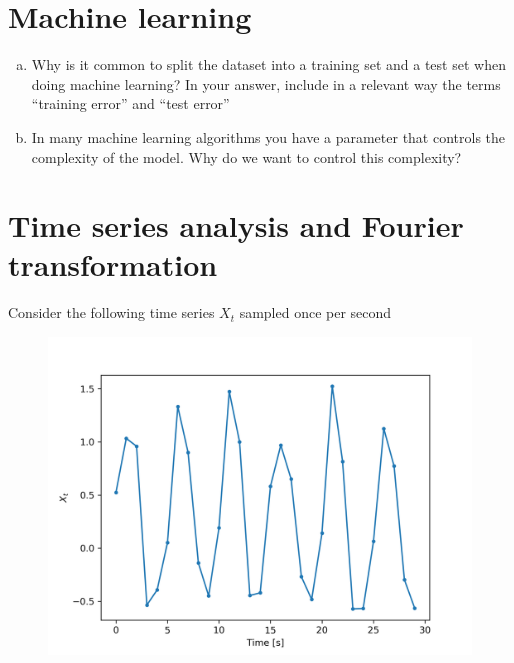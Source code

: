 \documentclass[12pt]{article}
\begin{document}
\pagebreak

\section{Machine learning}
\begin{enumerate}[(a)] 
\item Why is it common to split the dataset into a training set and a test set when doing machine learning? In your answer, include in a relevant way the terms “training error” and “test error”
\item In many machine learning algorithms you have a parameter that controls the complexity of the model. Why do we want to control this complexity?
\end{enumerate}

\pagebreak

\section{Time series analysis and Fourier transformation}
Consider the following time series $X_t$ sampled once per second

\begin{figure}[h!]
    \centering
    \includegraphics[width=.8\textwidth]{./fourier_figures/Fourier_ts} 
\end{figure}
\end{document}
